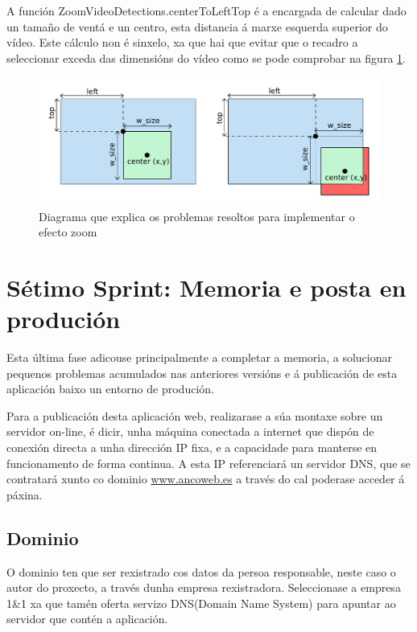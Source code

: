         A función ZoomVideoDetections.centerToLeftTop é a encargada de calcular dado un tamaño de ventá 
        e un centro, esta distancia á marxe esquerda superior do vídeo. Este cálculo non é sinxelo, xa que 
        hai que evitar que o recadro a seleccionar exceda das dimensións do vídeo como se pode
        comprobar na figura \ref{fig:centerToLeftTop}.
        
        \begin{figure}[htp]
        \begin{center}
            \includegraphics[scale=0.75]{figures/centerToLeftTop.pdf}
            \caption{Diagrama que explica os problemas resoltos para implementar o efecto zoom}
        \label{fig:centerToLeftTop}
        \end{center}
        \end{figure}

\section{Sétimo Sprint: Memoria e posta en produción}
    Esta última fase adicouse principalmente a completar a memoria, a solucionar pequenos problemas
    acumulados nas anteriores versións e á publicación de esta aplicación baixo un entorno de 
    produción.
    
    Para a publicación desta aplicación web, realizarase a súa montaxe sobre un servidor on-line,
    é dicir, unha máquina conectada a internet que dispón de conexión directa a unha dirección IP
    fixa, e a capacidade para manterse en funcionamento de forma continua. A esta IP referenciará un
    servidor DNS, que se contratará xunto co dominio \url{www.ancoweb.es} a través do cal poderase
    acceder á páxina.

    \subsection{Dominio}
        O dominio ten que ser rexistrado cos datos da persoa responsable, neste caso o autor do 
        proxecto, a través dunha empresa rexistradora. Seleccionase a empresa 1\&1
        \cite{1and1-website} xa que tamén oferta servizo DNS(Domain Name System) para apuntar ao 
        servidor que contén a aplicación.
        
